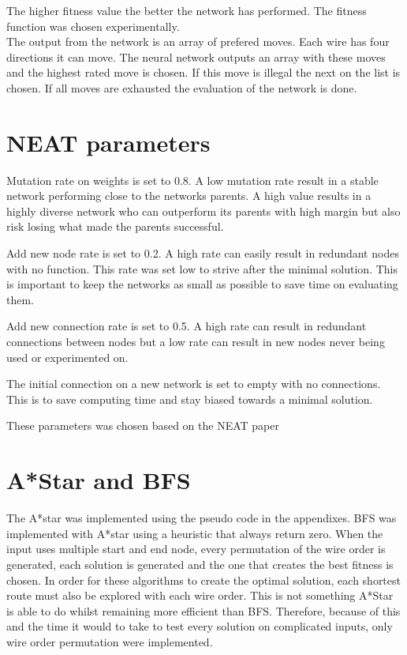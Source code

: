 \documentclass{kththesis}
\begin{document}
The higher fitness value the better the network has performed. The fitness function was chosen experimentally.\\
 
The output from the network is an array of prefered moves. Each wire has four directions it can move. The neural network outputs an array with these moves and the highest rated move is chosen. If this move is illegal the next on the list is chosen. If all moves are exhausted the evaluation of the network is done.
 
\section{NEAT parameters}
Mutation rate on weights is set to 0.8. A low mutation rate result in a stable network performing close to the networks parents. A high value results in a highly diverse network who can outperform its parents with high margin but also risk losing what made the parents successful.
 
Add new node rate is set to 0.2. A high rate can easily result in redundant nodes with no function. This rate was set low to strive after the minimal solution. This is important to keep the networks as small as possible to save time on evaluating them. 
 
Add new connection rate is set to 0.5. A high rate can result in redundant connections between nodes but a low rate can result in new nodes never being used or experimented on.
 
The initial connection on a new network is set to empty with no connections. This is to save computing time and stay biased towards a minimal solution.
 
These parameters was chosen based on the NEAT paper \parencite{NEAT111}
 
\section{A*Star and BFS}
The A*star was implemented using the pseudo code in the appendixes. BFS was implemented with A*star using a heuristic that always return zero. When the input uses multiple start and end node, every permutation of the wire order is generated, each solution is generated and the one that creates the best fitness is chosen. In order for these algorithms to create the optimal solution, each shortest route must also be explored with each wire order. This is not something A*Star is able to do whilst remaining more efficient than BFS. Therefore, because of this and the time it would to take to test every solution on complicated inputs, only wire order permutation were implemented.
 
\end{document}
